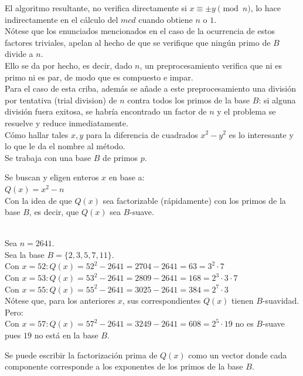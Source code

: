 El algoritmo resultante, no verifica directamente si $x \equiv \pm y \pmod n$, lo hace indirectamente en el cálculo del $mcd$ cuando obtiene $n$ o $1$. \\
Nótese que los enunciados mencionados en el caso de la ocurrencia de estos factores triviales, apelan al hecho de que se verifique que ningún primo de $B$ divide a $n$. \\
Ello se da por hecho, es decir, dado $n$, un preprocesamiento verifica que ni es primo ni es par, de modo que es compuesto e impar.\\
Para el caso de esta criba, además se añade a este preprocesamiento una división por tentativa (trial division) de $n$  contra todos los primos de la base $B$: si alguna división fuera exitosa, se habría encontrado un factor de $n$  y el problema se resuelve y reduce inmediatamente. \\

Cómo hallar tales $x,y$ para la diferencia de cuadrados $x^2 - y^2$ es lo interesante y lo que le da el nombre al método. \\

Se trabaja con una base $B$ de primos $p$.

Se buscan y eligen enteros $x$ en base a: \\
$Q(x) = x^2 - n$ \\
Con la idea de que $Q(x)$ sea factorizable (rápidamente) con los primos de la base $B$, es decir, que $Q(x)$ sea $B$-suave. 

\begin{ejemplo} \, \\
Sea $n=2641$. \\
Sea la base $B = \{ 2,3,5,7,11 \}$. \\
Con $x=52: Q(x)=52^2 - 2641=2704 - 2641=63=3^2\cdot 7$ \\
Con $x=53: Q(x)=53^2 - 2641=2809 - 2641=168=2^3\cdot 3\cdot 7$ \\
Con $x=55: Q(x)=55^2 - 2641=3025 - 2641=384=2^7\cdot 3$ \\
Nótese que, para los anteriores $x$, sus correspondientes $Q(x)$ tienen $B$-suavidad. Pero: \\
Con $x=57: Q(x)=57^2 - 2641=3249 - 2641=608=2^5 \cdot 19$ no es $B$-suave pues $19$ no está en la base $B$.
\end{ejemplo}

Se puede escribir la factorización prima de $Q(x)$ como un vector donde cada componente corresponde a los exponentes de los primos de la base $B$.

